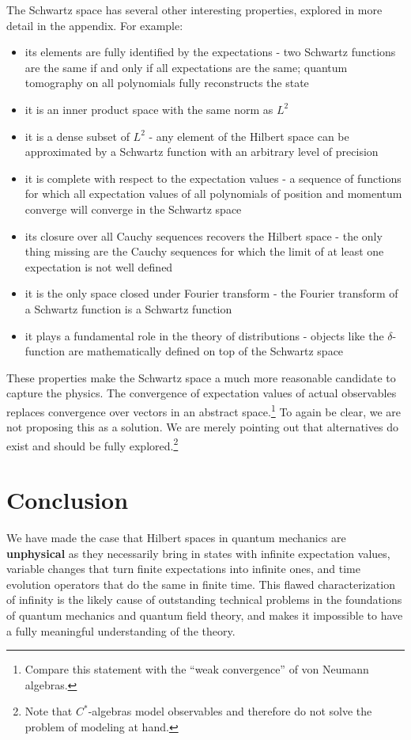 \documentclass[10pt,twocolumn, nofootinbib]{revtex4-2}
\begin{document}
The Schwartz space has several other interesting properties,\cite{moretti_spectral_2017, reed_methods_1980} explored in more detail in the appendix. For example:

\begin{itemize}
\item its elements are fully identified by the expectations - two Schwartz functions are the same if and only if all expectations are the same; quantum tomography on all polynomials fully reconstructs the state
\item it is an inner product space with the same norm as $L^2$
\item it is a dense subset of $L^2$ - any element of the Hilbert space can be approximated by a Schwartz function with an arbitrary level of precision
\item it is complete with respect to the expectation values - a sequence of functions for which all expectation values of all polynomials of position and momentum converge will converge in the Schwartz space
\item its closure over all Cauchy sequences recovers the Hilbert space - the only thing missing are the Cauchy sequences for which the limit of at least one expectation is not well defined
\item it is the only space closed under Fourier transform - the Fourier transform of a Schwartz function is a Schwartz function
\item it plays a fundamental role in the theory of distributions - objects like the $\delta$-function are mathematically defined on top of the Schwartz space
\end{itemize}
These properties make the Schwartz space a much more reasonable candidate to capture the physics. The convergence of expectation values of actual observables replaces convergence over vectors in an abstract space.\footnote{Compare this statement with the ``weak convergence'' of von Neumann algebras.} To again be clear, we are not proposing this as a solution. We are merely pointing out that alternatives do exist and should be fully explored.\footnote{Note that $C^*$-algebras model observables and therefore do not solve the problem of modeling at hand.}

\section{Conclusion}

We have made the case that Hilbert spaces in quantum mechanics are \textbf{unphysical} as they necessarily bring in states with infinite expectation values, variable changes that turn finite expectations into infinite ones, and time evolution operators that do the same in finite time. This flawed characterization of infinity is the likely cause of outstanding technical problems in the foundations of quantum mechanics and quantum field theory, and makes it impossible to have a fully meaningful understanding of the theory.
\end{document}
